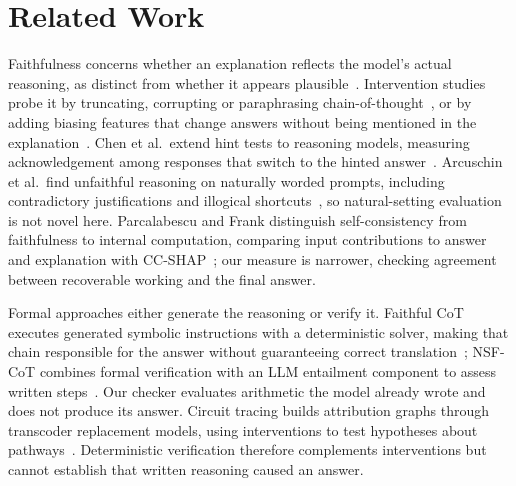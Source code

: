 \section{Related Work}\label{sec:related}
Faithfulness concerns whether an explanation reflects the model's actual reasoning, as
distinct from whether it appears plausible~\cite{jacovi2020}. Intervention studies probe
it by truncating, corrupting or paraphrasing chain-of-thought~\cite{lanham2023}, or by
adding biasing features that change answers without being mentioned in the
explanation~\cite{turpin2023}. Chen et al.\ extend hint tests to reasoning models,
measuring acknowledgement among responses that switch to the hinted
answer~\cite{chen2025}. Arcuschin et al.\ find unfaithful reasoning on naturally worded
prompts, including contradictory justifications and illogical
shortcuts~\cite{arcuschin2025}, so natural-setting evaluation is not novel here.
Parcalabescu and Frank distinguish self-consistency from faithfulness to internal
computation, comparing input contributions to answer and explanation with
CC-SHAP~\cite{parcalabescu2024}; our measure is narrower, checking agreement between
recoverable working and the final answer.

Formal approaches either generate the reasoning or verify it. Faithful CoT executes
generated symbolic instructions with a deterministic solver, making that chain
responsible for the answer without guaranteeing correct translation~\cite{lyu2023};
NSF-CoT combines formal verification with an LLM entailment component to assess written
steps~\cite{pramanik2026}. Our checker evaluates arithmetic the model already wrote and
does not produce its answer. Circuit tracing builds attribution graphs through
transcoder replacement models, using interventions to test hypotheses about
pathways~\cite{ameisen2025}. Deterministic verification therefore complements
interventions but cannot establish that written reasoning caused an answer.
